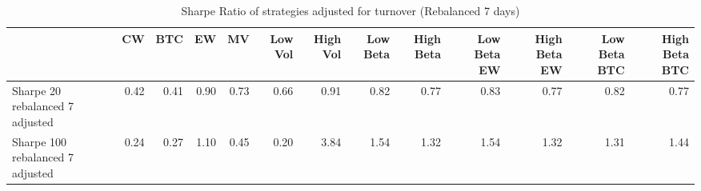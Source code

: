 \begin{table}
\centering
\caption{Sharpe Ratio of strategies adjusted for turnover (Rebalanced 7 days)}
\label{sharpe7}
\begin{tabular}{lrrrrrrrrrrrr}
\toprule
{} &   CW &  BTC &   EW &   MV &  Low Vol &  High Vol &  Low Beta &  High Beta &  Low Beta EW &  High Beta EW &  Low Beta BTC &  High Beta BTC \\
\midrule
Sharpe 20 rebalanced 7 adjusted  & 0.42 & 0.41 & 0.90 & 0.73 &     0.66 &      0.91 &      0.82 &       0.77 &         0.83 &          0.77 &          0.82 &           0.77 \\
Sharpe 100 rebalanced 7 adjusted & 0.24 & 0.27 & 1.10 & 0.45 &     0.20 &      3.84 &      1.54 &       1.32 &         1.54 &          1.32 &          1.31 &           1.44 \\
\bottomrule
\end{tabular}
\end{table}
